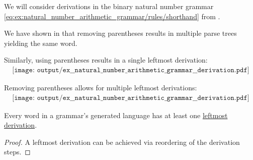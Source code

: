 \begin{example}\label{ex:natural_number_arithmetic_grammar/derivation}
  We will consider derivations in the binary natural number grammar \eqref{eq:ex:natural_number_arithmetic_grammar/rules/shorthand} from .

  We have shown in  that removing parentheses results in multiple parse trees yielding the same word.

  Similarly, using parentheses results in a single leftmost derivation:
  \begin{equation*}
    \begin{aligned}
      \texttt{[image: output/ex\_\_natural\_number\_arithmetic\_grammar\_\_derivation.pdf]}
    \end{aligned}
  \end{equation*}

  Removing parentheses allows for multiple leftmost derivations:
  \begin{equation*}
    \begin{aligned}
      \texttt{[image: output/ex\_\_natural\_number\_arithmetic\_grammar\_\_derivation.pdf]}
    \end{aligned}
  \end{equation*}
\end{example}

\begin{proposition}\label{thm:leftmost_derivation_existence}
  Every word in a grammar's generated language has at least one \hyperref[def:leftmost_derivation]{leftmost derivation}.
\end{proposition}
\begin{proof}
  A leftmost derivation can be achieved via reordering of the derivation steps.
\end{proof}


